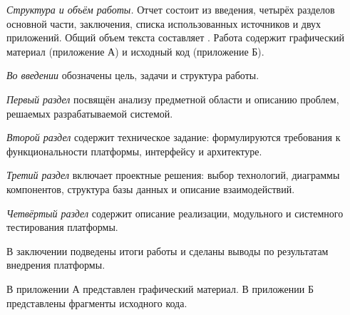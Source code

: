 \emph{Структура и объём работы.} Отчет состоит из введения, четырёх разделов основной части, заключения, списка использованных источников и двух приложений. Общий объем текста составляет . Работа содержит графический материал (приложение А) и исходный код (приложение Б).

\emph{Во введении} обозначены цель, задачи и структура работы.

\emph{Первый раздел} посвящён анализу предметной области и описанию проблем, решаемых разрабатываемой системой.

\emph{Второй раздел} содержит техническое задание: формулируются требования к функциональности платформы, интерфейсу и архитектуре.

\emph{Третий раздел} включает проектные решения: выбор технологий, диаграммы компонентов, структура базы данных и описание взаимодействий.

\emph{Четвёртый раздел} содержит описание реализации, модульного и системного тестирования платформы.

В заключении подведены итоги работы и сделаны выводы по результатам внедрения платформы.

В приложении А представлен графический материал.
В приложении Б представлены фрагменты исходного кода. 
